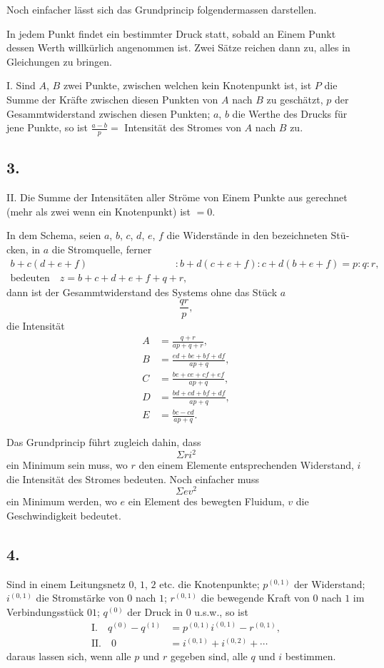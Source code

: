 \documentclass[fontsize=10pt,paper=a5,pagesize=auto]{scrbook}
\newcommand{\origpage}[1]{\marginpar{\footnotesize\textit{S. #1}}}
\begin{document}
Noch einfacher lässt sich das Grundprincip folgendermassen darstellen.

In jedem Punkt findet ein bestimmter Druck statt, sobald an Einem Punkt dessen Werth willkürlich angenommen ist. Zwei Sätze reichen dann zu, alles in Gleichungen zu bringen.

\textsc{I.} Sind $A$, $B$ zwei Punkte, zwischen welchen kein Knotenpunkt ist, ist $P$ die Summe der Kräfte zwischen diesen Punkten von $A$ nach $B$ zu geschätzt, $p$ der Gesammtwiderstand zwischen diesen Punkten; $a$, $b$ die Werthe des Drucks für jene Punkte, so ist $\frac{a - b}{p} = $ Intensität des Stromes von $A$ nach $B$ zu.

\subsection*{3.}
\origpage{603}
\textsc{II.} Die Summe der Intensitäten aller Ströme von Einem Punkte aus gerechnet (mehr als zwei wenn ein Knotenpunkt) ist $= 0$.

\begin{otherlanguage}{ngerman}
In dem Schema, seien $a$, $b$, $c$, $d$, $e$, $f$ die Widerstände in den bezeichneten Stücken, in $a$ die Stromquelle, ferner
\begin{align*}
b + c(d + e + f) &: b + d(c + e + f) : c + d(b + e + f) = p : q : r,\\
\text{bedeuten} \quad z = b + c + d + e + f + q + r,&
\end{align*}
dann ist der Gesammtwiderstand des Systems ohne das Stück $a$
\[
\frac{qr}{p},
\]
die Intensität
\begin{align*}
A &= \frac{q + r}{ap + q + r},\\
B &= \frac{ed + be + bf + df}{ap + q},\\
C &= \frac{be + ce + cf + ef}{ap + q},\\
D &= \frac{bd + cd + bf + df}{ap + q},\\
E &= \frac{bc - cd}{ap + q}.
\end{align*}
\end{otherlanguage}

Das Grundprincip führt zugleich dahin, dass
\[
\Sigma r i^2
\]
ein Minimum sein muss, wo $r$ den einem Elemente entsprechenden Widerstand, $i$ die Intensität des Stromes bedeuten. Noch einfacher muss
\[
\Sigma e v^2
\]
ein Minimum werden, wo $e$ ein Element des bewegten Fluidum, $v$ die Geschwindigkeit bedeutet.

\subsection*{4.}
\origpage{604}
Sind in einem Leitungsnetz $0$, $1$, $2$ etc. die Knotenpunkte; $p^{(0,1)}$ der Widerstand; $i^{(0,1)}$ die Stromstärke von $0$ nach $1$; $r^{(0,1)}$ die bewegende Kraft von $0$ nach $1$ im Verbindungsstück $01$; $q^{(0)}$ der Druck in $0$ u.s.w., so ist
\begin{align*}
\text{I.} \quad q^{(0)} - q^{(1)} &= p^{(0,1)} i^{(0,1)} - r^{(0,1)},\\
\text{II.} \quad 0 &= i^{(0,1)} + i^{(0,2)} + \cdots
\end{align*}
daraus lassen sich, wenn alle $p$ und $r$ gegeben sind, alle $q$ und $i$ bestimmen.
\end{document}

